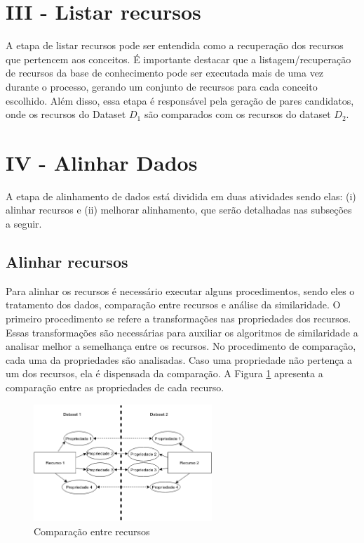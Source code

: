 \section{III - Listar recursos}
A etapa de listar recursos pode ser entendida como a recuperação dos recursos que pertencem aos conceitos. É importante destacar que a listagem/recuperação de recursos da base de conhecimento pode ser executada mais de uma vez durante o processo, gerando um conjunto de recursos para cada conceito escolhido. Além disso, essa etapa é responsável pela geração de pares candidatos, onde os recursos do Dataset $D_{1}$ são comparados com os recursos do dataset $D_{2}$.


\section{IV - Alinhar Dados}
A etapa de alinhamento de dados está dividida em duas atividades sendo elas: (i) alinhar recursos e (ii) melhorar alinhamento, que serão detalhadas nas subseções a seguir.

\subsection{Alinhar recursos}
Para alinhar os recursos é necessário executar alguns procedimentos, sendo eles o tratamento dos dados, comparação entre recursos e análise da similaridade. O primeiro procedimento se refere a transformações nas propriedades dos recursos. Essas transformações são necessárias para auxiliar os algoritmos de similaridade a analisar melhor a semelhança entre os recursos. No procedimento de comparação, cada uma da propriedades são analisadas. Caso uma propriedade não pertença a um dos recursos, ela é dispensada da comparação. A Figura  \ref{fig:resources} apresenta a comparação entre as propriedades de cada recurso.

\begin{figure}[!ht]
	\centering
	\includegraphics[width=0.6\textwidth]{./imagens/resources.png}
    \caption{Comparação entre recursos}
	\label{fig:resources}
\end{figure}

